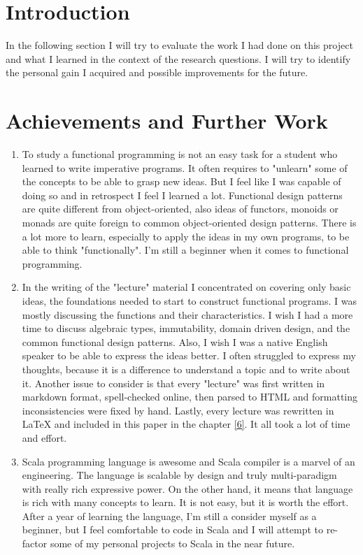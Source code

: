 \documentclass[12pt,twoside,a4paper]{report}
\begin{document}
\section{Introduction}\label{7.1}
In the following section I will try to evaluate the work I had done on this project and what I learned in the context of the research questions. I will try to identify the personal gain I acquired and possible improvements for the future.

\section{Achievements and Further Work}\label{7.2}
\begin{enumerate}\itemsep1pt \parskip0pt 
\item To study a functional programming is not an easy task for a student who learned to write imperative programs. It often requires to "unlearn" some of the concepts to be able to grasp new ideas. But I feel like I was capable of doing so and in retrospect I feel I learned a lot. Functional design patterns are quite different from object-oriented, also ideas of functors, monoids or monads are quite foreign to common object-oriented design patterns. There is a lot more to learn, especially to apply the ideas in my own programs, to be able to think "functionally". I'm still a beginner when it comes to functional programming.
\item In the writing of the "lecture" material I concentrated on covering only basic ideas, the foundations needed to start to construct functional programs. I was mostly discussing the functions and their characteristics. I wish I had a more time to discuss algebraic types, immutability, domain driven design, and the common functional design patterns. Also, I wish I was a native English speaker to be able to express the ideas better. I often struggled to express my thoughts, because it is a difference to understand a topic and to write about it. Another issue to consider is that every "lecture" was first written in markdown format, spell-checked online, then parsed to HTML and formatting inconsistencies were fixed by hand. Lastly, every lecture was rewritten in LaTeX and included in this paper in the chapter \ref{6}. It all took a lot of time and effort.
\item Scala programming language is awesome and Scala compiler is a marvel of an engineering. The language is scalable by design and truly multi-paradigm with really rich expressive power. On the other hand, it means that language is rich with many concepts to learn. It is not easy, but it is worth the effort. After a year of learning the language, I'm still a consider myself as a beginner, but I feel comfortable to code in Scala and I will attempt to re-factor some of my personal projects to Scala in the near future.

\end{enumerate}
\end{document}
